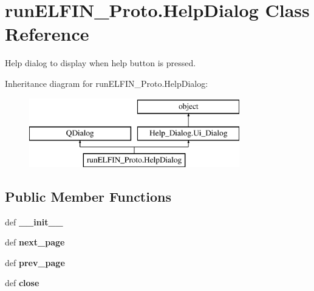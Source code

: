 \hypertarget{classrunELFIN__Proto_1_1HelpDialog}{\section{run\-E\-L\-F\-I\-N\-\_\-\-Proto.\-Help\-Dialog Class Reference}
\label{classrunELFIN__Proto_1_1HelpDialog}
}


Help dialog to display when help button is pressed.  


Inheritance diagram for run\-E\-L\-F\-I\-N\-\_\-\-Proto.\-Help\-Dialog\-:\begin{figure}[H]
\begin{center}
\leavevmode
\includegraphics[height=3.000000cm]{classrunELFIN__Proto_1_1HelpDialog}
\end{center}
\end{figure}
\subsection*{Public Member Functions}
\begin{DoxyCompactItemize}
\item 
\hypertarget{classrunELFIN__Proto_1_1HelpDialog_af80d32e0edfb5fb4244a16220ba96de2}{def {\bfseries \-\_\-\-\_\-init\-\_\-\-\_\-}}\label{classrunELFIN__Proto_1_1HelpDialog_af80d32e0edfb5fb4244a16220ba96de2}

\item 
\hypertarget{classrunELFIN__Proto_1_1HelpDialog_a9bdb7b0d9ca12b76645a59ce8ad18a06}{def {\bfseries next\-\_\-page}}\label{classrunELFIN__Proto_1_1HelpDialog_a9bdb7b0d9ca12b76645a59ce8ad18a06}

\item 
\hypertarget{classrunELFIN__Proto_1_1HelpDialog_ac62d4e4a3483b9580038506b086e3561}{def {\bfseries prev\-\_\-page}}\label{classrunELFIN__Proto_1_1HelpDialog_ac62d4e4a3483b9580038506b086e3561}

\item 
\hypertarget{classrunELFIN__Proto_1_1HelpDialog_a4af56d945a598a2a03aa8a6de494d87b}{def {\bfseries close}}\label{classrunELFIN__Proto_1_1HelpDialog_a4af56d945a598a2a03aa8a6de494d87b}

\end{DoxyCompactItemize}
